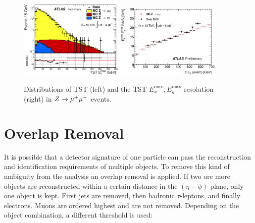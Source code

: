 \begin{figure}
    \centering
    \includegraphics[width=0.45\textwidth]{./figures/object_selection/etmiss_performance_tst_zmm.eps}
    \includegraphics[width=0.45\textwidth]{./figures/object_selection/etmiss_resolution_tst_zmm.eps}
    \caption{Distributions of TST \etmiss{} (left) and the TST $E^\text{miss}_x, E^\text{miss}_y$ resolution (right)
    in $Z \to \mu^+\mu^-$ events.~\cite{ATL-PHYS-PUB-2015-027}}\label{fig:object_selection:etmiss}
\end{figure}

\section{Overlap Removal}\label{sec:object_selection:overlap_removal}

It is possible that a detector signature of one particle can pass the reconstruction and identification requirements of multiple objects.
To remove this kind of ambiguity from the analysis an overlap removal is applied.
If two ore more objects are reconstructed within a certain distance \dr{} in the $(\eta - \phi)$ plane, only one object is kept.
First jets are removed, then hadronic $\tau$-leptons, and finally electrons.
Muons are ordered highest and are not removed.
Depending on the object combination, a different \dr{} threshold is used:

